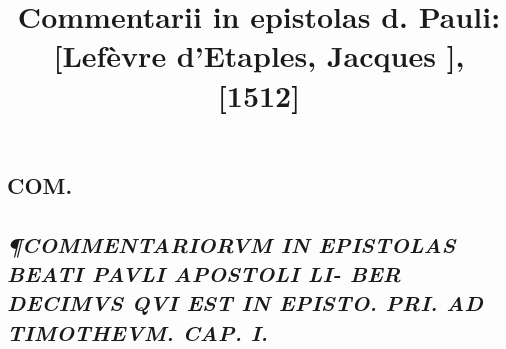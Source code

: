 \documentclass{article}
\begin{document}
\date{}
        \title{Commentarii in epistolas d. Pauli: [Lefèvre d'Etaples, Jacques ], [1512]}
\maketitle
\tableofcontents
\clearpage
\begin{pages} 
\beginnumbering
        
\section*{COM. }
\marginpar{[ p.]}
{}
\subsection*{\textit{¶COMMENTARIORVM IN EPISTOLAS BEATI PAVLI APOSTOLI LI- BER DECIMVS QVI EST IN EPISTO. PRI. AD TIMOTHEVM. CAP. I. }}

\end{pages}
\end{document}
